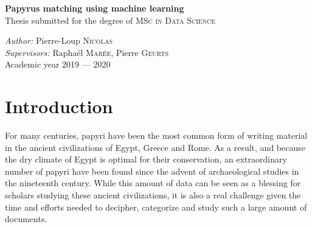 \documentclass[11pt]{report}
\begin{document}
\begin{center}

    { \Large  \textbf{Papyrus matching using machine learning}\\[0.2cm] }
    {Thesis submitted for the degree of \textsc{MSc in Data Science}}
    
    {\textit{Author:} Pierre-Loup \textsc{Nicolas}\\
     \textit{Supervisors:} Raphaël \textsc{Marée}, Pierre \textsc{Geurts}\\[0.1cm]}
    {Academic year 2019 — 2020}\\[1cm]

\end{center}



\newpage


    
    

\newpage

\tableofcontents


\newpage


\chapter{Introduction}

For many centuries, papyri have been the most common form of writing material in the ancient civilizations of Egypt, Greece and Rome. As a result, and because the dry climate of Egypt is optimal for their conservation, an extraordinary number of papyri have been found since the advent of archaeological studies in the nineteenth century. While this amount of data can be seen as a blessing for scholars studying these ancient civilizations, it is also a real challenge given the time and efforts needed to decipher, categorize and study such a large amount of documents.\newline
\end{document}
